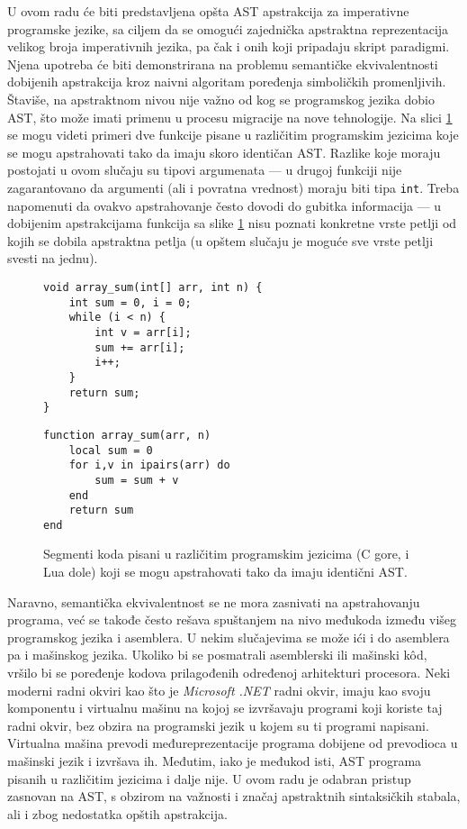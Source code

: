 U ovom radu će biti predstavljena opšta AST apstrakcija za imperativne programske jezike, sa ciljem da se omogući zajednička apstraktna reprezentacija velikog broja imperativnih jezika, pa čak i onih koji pripadaju skript paradigmi. Njena upotreba će biti demonstrirana na problemu semantičke ekvivalentnosti dobijenih apstrakcija kroz naivni algoritam poređenja simboličkih promenljivih. Štaviše, na apstraktnom nivou nije važno od kog se programskog jezika dobio AST, što može imati primenu u procesu migracije na nove tehnologije. Na slici \ref{fig:IntroExample} se mogu videti primeri dve funkcije pisane u različitim programskim jezicima koje se mogu apstrahovati tako da imaju skoro identičan AST. Razlike koje moraju postojati u ovom slučaju su tipovi argumenata --- u drugoj funkciji nije zagarantovano da argumenti (ali i povratna vrednost) moraju biti tipa \texttt{int}. Treba napomenuti da ovakvo apstrahovanje često dovodi do gubitka informacija --- u dobijenim apstrakcijama funkcija sa slike \ref{fig:IntroExample} nisu poznati konkretne vrste petlji od kojih se dobila apstraktna petlja (u opštem slučaju je moguće sve vrste petlji svesti na jednu).

\begin{figure}[h!]
\begin{lstlisting}
void array_sum(int[] arr, int n) {
    int sum = 0, i = 0;
    while (i < n) {
        int v = arr[i];    
        sum += arr[i];
        i++;
    }
    return sum;
}
\end{lstlisting}
\begin{lstlisting}
function array_sum(arr, n)
    local sum = 0
    for i,v in ipairs(arr) do
        sum = sum + v
    end
    return sum
end
\end{lstlisting}
\caption{Segmenti koda pisani u različitim programskim jezicima (C gore, i Lua dole) koji se mogu apstrahovati tako da imaju identični AST.}
\label{fig:IntroExample}
\end{figure}

Naravno, semantička ekvivalentnost se ne mora zasnivati na apstrahovanju programa, već se takođe često rešava spuštanjem na nivo međukoda između višeg programskog jezika i asemblera. U nekim slučajevima se može ići i do asemblera pa i mašinskog jezika. Ukoliko bi se posmatrali asemblerski ili mašinski k\^od, vršilo bi se poređenje kodova prilagođenih određenoj arhitekturi procesora. Neki moderni radni okviri kao što je \emph{Microsoft .NET} radni okvir, imaju kao svoju komponentu i virtualnu mašinu na kojoj se izvršavaju programi koji koriste taj radni okvir, bez obzira na programski jezik u kojem su ti programi napisani. Virtualna mašina prevodi međureprezentacije  programa dobijene od prevodioca u mašinski jezik i izvršava ih. Međutim, iako je međukod isti, AST programa pisanih u različitim jezicima i dalje nije. U ovom radu je odabran pristup zasnovan na AST, s obzirom na važnosti i značaj apstraktnih sintaksičkih stabala, ali i zbog nedostatka opštih apstrakcija.

